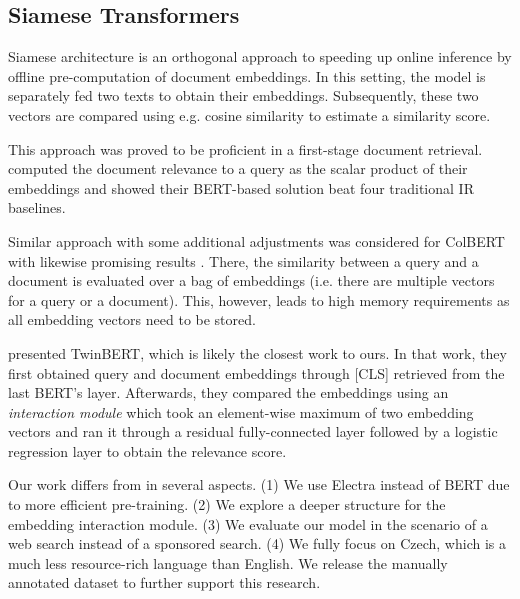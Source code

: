 \documentclass[letterpaper]{article} \usepackage{aaai22 }  \usepackage{times}  \usepackage{helvet}  \usepackage{courier}  \usepackage[hyphens]{url}  \usepackage{graphicx} \usepackage{amsmath,amsfonts,amssymb, mathabx,bm,bbm}
\begin{document}
\subsection{Siamese Transformers}\label{subsec:siamese}
Siamese architecture \cite{sentence_bert} is an orthogonal approach to speeding up online inference by offline pre-computation of document embeddings. In this setting, the model is separately fed two texts to obtain their embeddings. Subsequently, these two vectors are compared using e.g. cosine similarity to estimate a similarity score.

This approach was proved to be proficient in a first-stage document retrieval. \citet{repbert} computed the document relevance to a query as the scalar product of their embeddings and showed their BERT-based solution beat four traditional IR baselines. 

Similar approach with some additional adjustments was considered for ColBERT with likewise promising results \cite{colbert}. There, the similarity between a query and a document is evaluated over a bag of embeddings (i.e. there are multiple vectors for a query or a document). This, however, leads to high memory requirements as all embedding vectors need to be stored.

\citet{twinbert} presented TwinBERT, which is likely the closest work to ours. In that work, they first obtained query and document embeddings through [CLS] retrieved from the last BERT's layer. Afterwards, they compared the embeddings using an \textit{interaction module} which took an element-wise maximum of two embedding vectors and ran it through a residual fully-connected layer followed by a logistic regression layer to obtain the relevance score.

Our work differs from \citet{twinbert} in several aspects. (1) We use Electra instead of BERT due to more efficient pre-training. (2) We explore a deeper structure for the embedding interaction module. (3) We evaluate our model in the scenario of a web search instead of a sponsored search. (4) We fully focus on Czech, which is a much less resource-rich language than English. We release the manually annotated dataset to further support this research.
\end{document}
